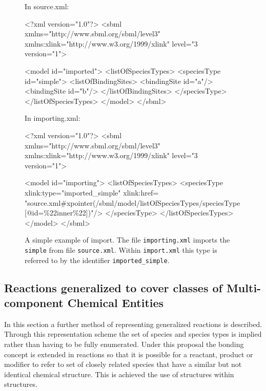 \documentclass{cekarticle}
\begin{document}
\begin{figure}
In source.xml:
\begin{example}
<?xml version="1.0"?>
<sbml
    xmlns="http://www.sbml.org/sbml/level3"
    xmlns:xlink="http://www.w3.org/1999/xlink"
    level="3
    version="1">

    <model id="imported">
        <listOfSpeciesTypes>
            <speciesType id="simple">
                <listOfBindingSites>
                    <bindingSite id="a"/>
                    <bindingSite id="b"/>
                </listOfBindingSites>
            </speciesType>
        </listOfSpeciesTypes>
    </model>
</sbml>
\end{example}
In importing.xml:
\begin{example}
<?xml version="1.0"?>
<sbml
    xmlns="http://www.sbml.org/sbml/level3"
    xmlns:xlink="http://www.w3.org/1999/xlink"
    level="3
    version="1">

    <model id="importing">
        <listOfSpeciesTypes>
           <speciesType
               xlink:type="imported_simple"
               xlink:href=
"source.xml#xpointer(/sbml/model/listOfSpeciesTypes/speciesType[@id=\%22inner\%22])"/>
           </speciesType>
        </listOfSpeciesTypes>
    </model>
</sbml>
\end{example}
\caption{A simple example of  import. The file
\texttt{importing.xml} imports the 
\texttt{simple} from file \texttt{source.xml}.  Within
\texttt{import.xml} this type is referred to by the identifier
\texttt{imported\_simple}.}

\label{fig:import}
\end{figure}

\subsection{Reactions generalized to cover classes of Multi-component Chemical Entities}
\label{sec:generalizedreactions}

In this section a further method of representing generalized
reactions is described.  Through this representation scheme the
set of species and species types is implied rather than having to
be fully enumerated. Under this proposal the bonding concept is
extended in reactions so that it is possible for a reactant,
product or modifier to refer to set of closely related species
that have a similar but not identical chemical structure. This is
achieved the use of  structures within
 structures.
\end{document}

